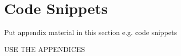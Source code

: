 \chapter{Code Snippets}

Put appendix material in this section e.g. code snippets 

USE THE APPENDICES